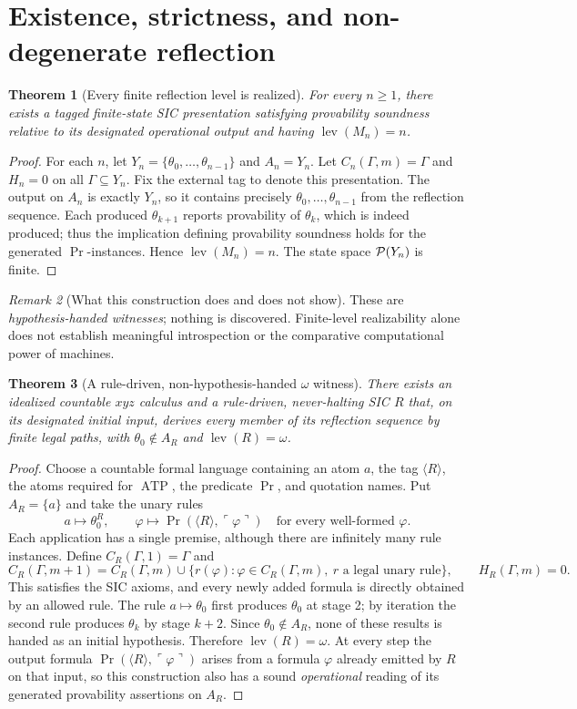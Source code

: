 \documentclass[11pt,letterpaper]{article}
\newtheorem{theorem}{Theorem}[section]
\theoremstyle{definition}\newtheorem{definition}[theorem]{Definition}\newtheorem{example}[theorem]{Example}\newtheorem{protocol}[theorem]{Protocol}\newtheorem{question}[theorem]{Open Problem}
\theoremstyle{remark}\newtheorem{remark}[theorem]{Remark}
\newcommand{\lev}{\operatorname{lev}}
\newcommand{\Prov}{\operatorname{Pr}}
\newcommand{\qname}[1]{\ulcorner #1\urcorner}
\begin{document}
\section{Existence, strictness, and non-degenerate reflection}
\begin{theorem}[Every finite reflection level is realized]\label{thm:finite}
For every $n\ge1$, there exists a tagged finite-state SIC presentation satisfying provability soundness relative to its designated operational output and having $\lev(M_n)=n$.
\end{theorem}
\begin{proof}
For each $n$, let $Y_n=\{\theta_0,\dots,\theta_{n-1}\}$ and $A_n=Y_n$. Let $C_n(\Gamma,m)=\Gamma$ and $H_n=0$ on all $\Gamma\subseteq Y_n$. Fix the external tag to denote this presentation. The output on $A_n$ is exactly $Y_n$, so it contains precisely $\theta_0,\dots,\theta_{n-1}$ from the reflection sequence. Each produced $\theta_{k+1}$ reports provability of $\theta_k$, which is indeed produced; thus the implication defining provability soundness holds for the generated $\Prov$-instances. Hence $\lev(M_n)=n$. The state space $\mathcal P(Y_n)$ is finite.
\end{proof}
\begin{remark}[What this construction does and does not show]
These are \emph{hypothesis-handed witnesses}; nothing is discovered. Finite-level realizability alone does not establish meaningful introspection or the comparative computational power of machines.
\end{remark}
\begin{theorem}[A rule-driven, non-hypothesis-handed $\omega$ witness]\label{thm:ruleomega}
There exists an idealized countable $xyz$ calculus and a rule-driven, never-halting SIC $R$ that, on its designated initial input, derives every member of its reflection sequence by finite legal paths, with $\theta_0\notin A_R$ and $\lev(R)=\omega$.
\end{theorem}
\begin{proof}
Choose a countable formal language containing an atom $a$, the tag $\langle R\rangle$, the atoms required for $\operatorname{ATP}$, the predicate $\Prov$, and quotation names. Put $A_R=\{a\}$ and take the unary rules
\[
a\longmapsto\theta_0^R,\qquad \varphi\longmapsto\Prov(\langle R\rangle,\qname{\varphi})\quad\text{for every well-formed }\varphi.
\]
Each application has a single premise, although there are infinitely many rule instances. Define $C_R(\Gamma,1)=\Gamma$ and
\[
C_R(\Gamma,m+1)=C_R(\Gamma,m)\cup\{r(\varphi):\varphi\in C_R(\Gamma,m),\ r\text{ a legal unary rule}\},
\qquad H_R(\Gamma,m)=0.
\]
This satisfies the SIC axioms, and every newly added formula is directly obtained by an allowed rule. The rule $a\mapsto\theta_0$ first produces $\theta_0$ at stage 2; by iteration the second rule produces $\theta_k$ by stage $k+2$. Since $\theta_0\notin A_R$, none of these results is handed as an initial hypothesis. Therefore $\lev(R)=\omega$. At every step the output formula $\Prov(\langle R\rangle,\qname{\varphi})$ arises from a formula $\varphi$ already emitted by $R$ on that input, so this construction also has a sound \emph{operational} reading of its generated provability assertions on $A_R$.
\end{proof}
\end{document}

